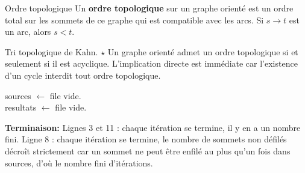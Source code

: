 \documentclass[french, 11pt]{article}
\begin{document}
\begin{defi}{Ordre topologique}{}
    Un \textbf{ordre topologique} sur un graphe orienté est un ordre total sur les sommets de ce graphe qui est compatible avec les arcs. Si $s\to t$ est un arc, alors $s<t$.
\end{defi}

\vspace*{-0.7cm}

\begin{prop}{Tri topologique de Kahn. $\star$}{}
    Un graphe orienté admet un ordre topologique si et seulement si il est acyclique.
    \tcblower
    L'implication directe est immédiate car l'existence d'un cycle interdit tout ordre topologique.\\
    \hspace*{0.28cm}\begin{algorithm}[H]
        \LinesNumbered
        \caption{Tri topologique de Kahn}
        sources $\gets$ file vide.\\
        resultats $\gets$ file vide.\\
    \end{algorithm}
    \textbf{Terminaison:} Lignes 3 et 11 : chaque itération se termine, il y en a un nombre fini.
    Ligne 8 : chaque itération se termine, le nombre de sommets non défilés décroît strictement car un sommet ne peut être enfilé au plus qu'un fois dans sources, d'où le nombre fini d'itérations.
\end{prop}
\end{document}
